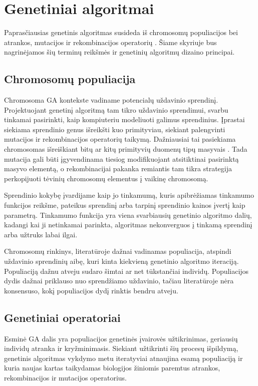 \documentclass{VUMIFInfKursinis}
\begin{document}
\section{Genetiniai algoritmai}

Paprasčiausias genetinis algoritmas susideda iš chromosomų populiacijos bei atrankos, mutacijos ir rekombinacijos operatorių \cite{simpson1999faster}.
Šiame skyriuje bus nagrinėjamos šių terminų reikšmės ir genetinių algoritmų dizaino principai.


\subsection{Chromosomų populiacija}

Chromosoma GA kontekste vadiname potencialų uždavinio sprendinį.
Projektuojant genetinį algoritmą tam tikro uždavinio sprendimui, svarbu tinkamai pasirinkti,
kaip kompiuteriu modeliuoti galimus sprendinius.
Įprastai siekiama sprendinio genus išreikšti kuo primityviau, siekiant
palengvinti mutacijos ir rekombinacijos operatorių taikymą.
Dažniausiai tai pasiekiama chromosomas išreiškiant bitų ar kitų primityvių duomenų tipų masyvais \cite{whitley1994genetic}.
Tada mutacija gali būti įgyvendinama tiesiog modifikuojant atsitiktinai pasirinktą masyvo elementą,
o rekombinacijai pakanka remiantis tam tikra strategija perkopijuoti tėvinių chromosomų elementus į vaikinę chromosomą.

Sprendinio kokybę įvardijame kaip jo tinkamumą, kuris apibrėžiamas tinkamumo funkcijos reikšme, pateikus sprendinį arba tarpinį sprendinio kainos įvertį kaip parametrą.
Tinkamumo funkcija yra viena svarbiausių genetinio algoritmo dalių,
kadangi kai ji netinkamai parinkta, algoritmas nekonverguos į tinkamą sprendinį arba užtruks labai ilgai.

Chromosomų rinkinys, literatūroje dažnai vadinamas populiacija, atspindi uždavinio sprendinių aibę, kuri kinta kiekvieną genetinio algoritmo iteraciją.
Populiaciją dažnu atveju sudaro šimtai ar net tūkstančiai individų.
Populiacijos dydis dažnai priklauso nuo sprendžiamo uždavinio,
tačiau literatūroje nėra konsensuso, kokį populiacijos dydį rinktis bendru atveju.


\subsection{Genetiniai operatoriai}

Esminė GA dalis yra populiacijos genetinės įvairovės užtikrinimas, geriausių individų atranka ir kryžminimasis.
Siekiant užtikrinti šių procesų išpildymą, genetinis algoritmas vykdymo metu
iteratyviai atnaujina esamą populiaciją ir kuria naujas kartas
taikydamas biologijos žiniomis paremtus atrankos, rekombinacijos ir mutacijos operatorius.
\end{document}
